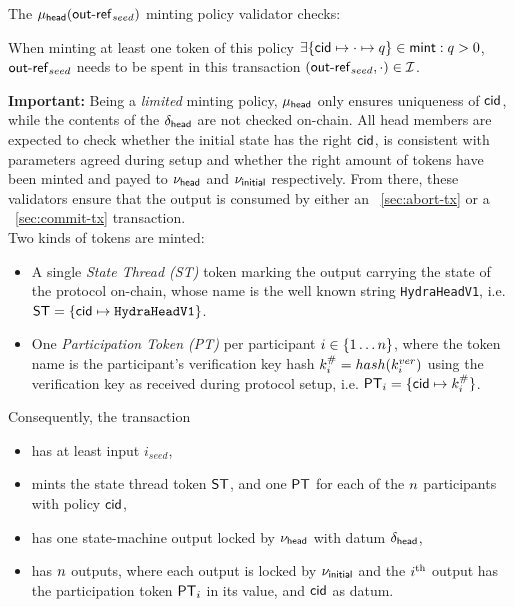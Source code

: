 \noindent The $\mu_\mathsf{head}(\mathsf{out\textsf{-}{}ref}_{seed})$ minting policy validator checks:
\begin{menumerate}
  \item When minting at least one token of this policy
  $\exists \{\mathsf{cid} \mapsto \cdot \mapsto q\} \in \mathsf{mint} : q > 0$, \\
  $\mathsf{out\textsf{-}{}ref}_{seed}$ needs to be spent in this transaction $(\mathsf{out\textsf{-}{}ref}_{seed}, \cdot) \in \mathcal{I}$.
\end{menumerate}

\noindent \textbf{Important:} Being a \emph{limited} minting policy, $\mu_\mathsf{head}$ only ensures
uniqueness of $\mathsf{cid}$, while the contents of the $\delta_{\mathsf{head}}$ are not
checked on-chain. All head members are expected to check whether the initial
state has the right $\mathsf{cid}$, is consistent with parameters agreed during setup
and whether the right amount of tokens have been minted and payed to $\nu_\mathsf{head}$
and $\nu_{\mathsf{initial}}$ respectively. From there, these validators ensure that the
output is consumed by either an \mtxAbort{}~\ref{sec:abort-tx} or a
\mtxCom{}~\ref{sec:commit-tx} transaction. \\

\noindent Two kinds of tokens are minted:
\begin{itemize}
  \item A single \emph{State Thread (ST)} token marking the output carrying the state
        of the protocol on-chain, whose name is the well known string
        \texttt{HydraHeadV1}, i.e.
        $\mathsf{ST} = \{\mathsf{cid} \mapsto \texttt{HydraHeadV1}\}$.
  \item One \emph{Participation Token (PT)} per participant
        $i \in \{1 \dots n \}$, where the token name is the participant's
        verification key hash $k^{\#}_{i} = hash(k^{ver}_{i})$ using the
        verification key as received during protocol setup, i.e.
        $\mathsf{PT}_{i} = \{\mathsf{cid} \mapsto k^{\#}_{i}\}$.
\end{itemize}

\noindent Consequently, the \mtxInit{} transaction

\begin{itemize}
  \item has at least input $i_{seed}$,
  \item mints the state thread token $\mathsf{ST}$, and one $\mathsf{PT}$ for each of the $n$
        participants with policy $\mathsf{cid}$,
  \item has one state-machine output locked by $\nu_\mathsf{head}$ with datum
        $\delta_{\mathsf{head}}$,
  \item has $n$ outputs, where each output is locked by $\nu_{\mathsf{initial}}$ and the
        $i^{\text{th}}$ output has the participation token $\mathsf{PT}_i$ in its value, and
        $\mathsf{cid}$ as datum.
\end{itemize}

